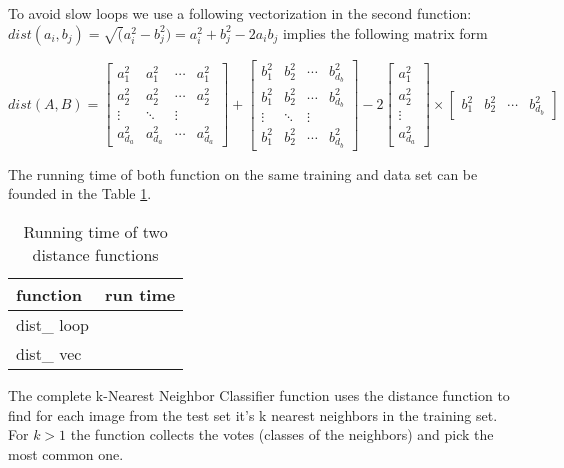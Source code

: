 \documentclass{article}
\begin{document}


To avoid slow loops we use a following vectorization in the second function:
\vspace*{12pt}
$dist(a_i,b_j) = \sqrt(a_i^2 - b_j^2) = a_i^2+b_j^2-2a_ib_j$ implies the following matrix form

$
dist(A,B) = 
\begin{bmatrix} 
	a_1^2 & a_1^2 & \cdots & a_1^2 \\
	a_2^2 & a_2^2 & \cdots & a_2^2 \\
	\vdots & \ddots & \vdots \\
	a_{d_a}^2 & a_{d_a}^2 & \cdots & a_{d_a}^2
\end{bmatrix}
+
\begin{bmatrix} 
	b_1^2 & b_2^2 & \cdots & b_{d_b}^2 \\
	b_1^2 & b_2^2 & \cdots & b_{d_b}^2 \\
	\vdots & \ddots & \vdots \\
	b_1^2 & b_2^2 & \cdots & b_{d_b}^2
\end{bmatrix}
-2
\left[ 
\begin{array}{c}
	 a_1^2 \\ a_2^2  \\ \vdots \\ a_{d_a}^2 \end{array} \right]
	 \times
	 \left[ \begin{array}{cccc} b_1^2 & b_2^2 & \cdots & b_{d_b}^2 \end{array} \right] 
$

\vspace*{12pt}

\vspace*{12pt}
The running time of both function on the same training and data set can be founded in the Table \ref{Tab1}.

\begin{table}[htb]
	\centering
	\begin{tabular}{|l | c|}
		\hline
		function & run time \\ \hline
		dist\_ loop &  \\ 
		dist\_ vec & \\ \hline 
	\end{tabular}
\caption{Running time of two distance functions}
\label{Tab1}
\end{table}

The complete k-Nearest Neighbor Classifier function uses the distance function to find for each image from the test set it's k nearest neighbors in the training set. For $k>1$ the function collects the votes (classes of the neighbors) and pick the most common one.
\end{document}
